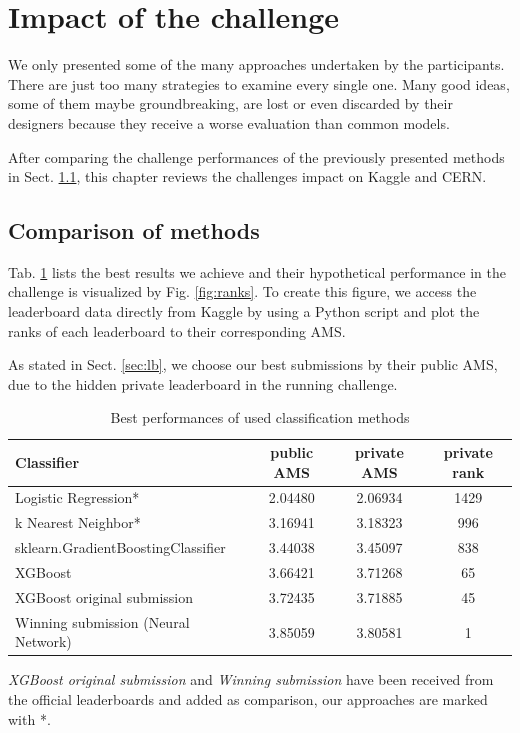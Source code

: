 \section{Impact of the challenge}\label{ch:disc}\raggedbottom
We only presented some of the many approaches undertaken by the participants. There are just too many strategies to examine every single one. Many good ideas, some of them maybe groundbreaking, are lost or even discarded by their designers because they receive a worse evaluation than common models.

After comparing the challenge performances of the previously presented methods in Sect. \ref{sec:comp}, this chapter reviews the challenges impact on Kaggle and CERN.

\subsection{Comparison of methods}\label{sec:comp}
Tab. \ref{tab:bestams} lists the best results we achieve and their hypothetical performance in the challenge is visualized by Fig. \ref{fig:ranks}. To create this figure, we access the leaderboard data directly from Kaggle by using a Python script and plot the ranks of each leaderboard to their corresponding AMS.

As stated in Sect. \ref{sec:lb}, we choose our best submissions by their public AMS, due to the hidden private leaderboard in the running challenge.

\begin{table}[h]
\centering
\begin{tabular}{|l|c|c|c|}
	\hline
	Classifier & public AMS & private AMS & private rank \\
	\hline
	Logistic Regression* & 2.04480 & 2.06934 & 1429 \\
	\hline
	k Nearest Neighbor* & 3.16941 & 3.18323 & 996 \\
	\hline
	sklearn.GradientBoostingClassifier & 3.44038 & 3.45097 & 838\\
	\hline
	XGBoost & 3.66421 & 3.71268 & 65 \\
	\hline
	XGBoost original submission & 3.72435 & 3.71885 & 45 \\
	\hline
	Winning submission (Neural Network) & 3.85059 & 3.80581 & 1 \\
	\hline
\end{tabular}

\vspace{1ex}

\emph{XGBoost original submission} and \emph{Winning submission} have been received from the official leaderboards and added as comparison, our approaches are marked with *. 
\caption{Best performances of used classification methods}
\label{tab:bestams}
\end{table}

